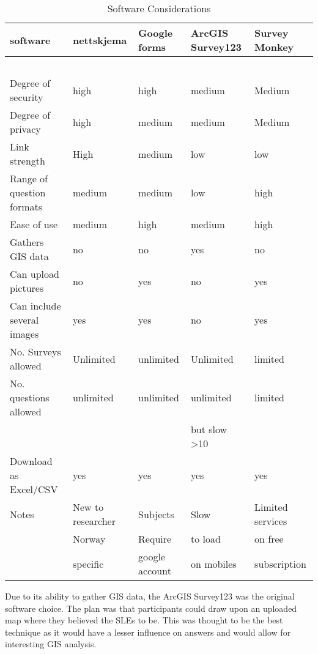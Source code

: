 \begin{table}[h]
    \centering
    \begin{tabular}{|l|l|l|l|l|}
    \hline
        \textbf{software} & \textbf{nettskjema} & \textbf{Google forms} & \textbf{ArcGIS Survey123} & \textbf{Survey Monkey} \\ \hline
        ~ & ~ & ~ & ~ & ~ \\ \hline
        Degree of security & high & high & medium & Medium \\ \hline
        Degree of privacy & high & medium & medium & Medium \\ \hline
        Link strength & High & medium & low & low \\ \hline
        Range of question formats & medium & medium & low & high \\ \hline
        Ease of use & medium & high & medium & high \\ \hline
        Gathers GIS data & no & no & yes & no \\ \hline
        Can upload pictures & no & yes & no & yes \\ \hline
        Can include several images & yes & yes & no & yes \\ \hline
        No. Surveys allowed & Unlimited & unlimited & Unlimited & limited \\ \hline
        No. questions allowed & unlimited & unlimited & unlimited & limited \\ \newline
        &  &  &  but slow >10 &  \\ \hline
        Download as Excel/CSV & yes & yes & yes & yes \\ \hline
        Notes & New to researcher & Subjects  & Slow  & Limited services\\ \newline
         & Norway & Require  & to load  & on free \\ \newline
         & specific & google account & on mobiles & subscription \\ \hline
    \end{tabular}
    \caption{Software Considerations}
    \label{table: software-considerations}
\end{table}

Due to its ability to gather GIS data, the ArcGIS Survey123 was the original software choice. The plan was that participants could draw upon an uploaded map where they believed the SLEs to be. This was thought to be the best technique as it would have a lesser influence on answers and would allow for interesting GIS analysis. 
